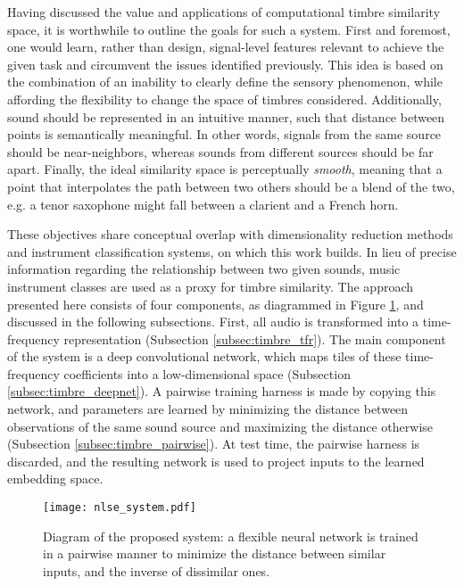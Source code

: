 Having discussed the value and applications of computational timbre similarity space, it is worthwhile to outline the goals for such a system.
First and foremost, one would learn, rather than design, signal-level features relevant to achieve the given task and circumvent the issues identified previously.
This idea is based on the combination of an inability to clearly define the sensory phenomenon, while affording the flexibility to change the space of timbres considered.
Additionally, sound should be represented in an intuitive manner, such that distance between points is semantically meaningful.
In other words, signals from the same source should be near-neighbors, whereas sounds from different sources should be far apart.
Finally, the ideal similarity space is perceptually \emph{smooth}, meaning that a point that interpolates the path between two others should be a blend of the two, e.g. a tenor saxophone might fall between a clarient and a French horn.

These objectives share conceptual overlap with dimensionality reduction methods and instrument classification systems, on which this work builds.
In lieu of precise information regarding the relationship between two given sounds, music instrument classes are used as a proxy for timbre similarity.
The approach presented here consists of four components, as diagrammed in Figure \ref{fig:nlse}, and discussed in the following subsections.
First, all audio is transformed into a time-frequency representation (Subsection \ref{subsec:timbre_tfr}).
The main component of the system is a deep convolutional network, which maps tiles of these time-frequency coefficients into a low-dimensional space (Subsection \ref{subsec:timbre_deepnet}).
A pairwise training harness is made by copying this network, and parameters are learned by minimizing the distance between observations of the same sound source and maximizing the distance otherwise (Subsection \ref{subsec:timbre_pairwise}).
At test time, the pairwise harness is discarded, and the resulting network is used to project inputs to the learned embedding space.


\begin{figure}[t]
\centering
\texttt{[image: nlse\_system.pdf]}
\caption{Diagram of the proposed system: a flexible neural network is trained in a pairwise manner to minimize the distance between similar inputs, and the inverse of dissimilar ones.}
\label{fig:nlse}
\end{figure}


